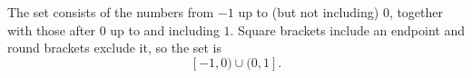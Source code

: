 The set consists of the numbers from $-1$ up to (but not including) $0$, together with those after $0$ up to and including $1$. Square brackets include an endpoint and round brackets exclude it, so the set is
\[
\boxed{[-1,0)\cup(0,1]}.
\]
